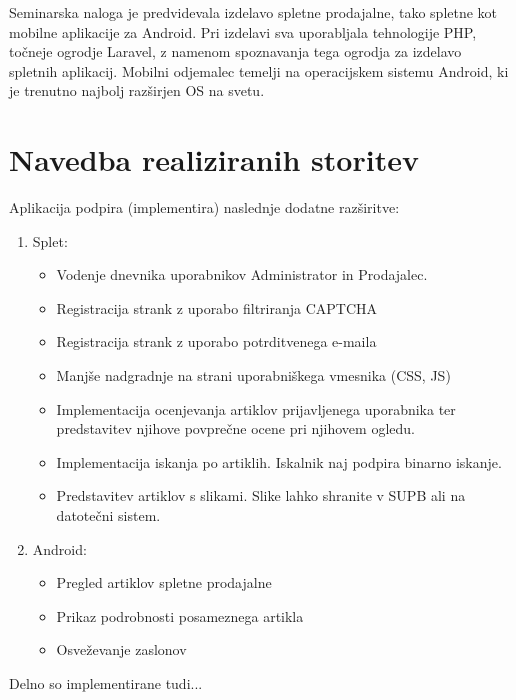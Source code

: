 \documentclass[a4paper,12pt]{report}
\begin{document}
Seminarska naloga je predvidevala izdelavo spletne prodajalne, tako spletne kot mobilne aplikacije za Android. Pri izdelavi sva uporabljala tehnologije PHP, točneje ogrodje Laravel, z namenom spoznavanja tega ogrodja za izdelavo spletnih aplikacij. Mobilni odjemalec temelji na operacijskem sistemu Android, ki je trenutno najbolj razširjen OS na svetu.


\chapter{Navedba realiziranih storitev}
Aplikacija podpira (implementira) naslednje dodatne razširitve:
\begin{enumerate}
    \item Splet:
    \begin{itemize}
        \item Vodenje dnevnika uporabnikov Administrator in Prodajalec.
        \item Registracija strank z uporabo filtriranja CAPTCHA
        \item Registracija strank z uporabo potrditvenega e-maila
        \item Manjše nadgradnje na strani uporabniškega vmesnika (CSS, JS)
        \item Implementacija ocenjevanja artiklov prijavljenega uporabnika ter predstavitev njihove povprečne ocene pri njihovem ogledu.
        \item Implementacija iskanja po artiklih. Iskalnik naj podpira binarno iskanje.
        \item Predstavitev artiklov s slikami. Slike lahko shranite v SUPB ali na datotečni sistem.
    \end{itemize}
    \item Android:
    \begin{itemize}
        \item Pregled artiklov spletne prodajalne
        \item Prikaz podrobnosti posameznega artikla
        \item Osveževanje zaslonov
    \end{itemize}
\end{enumerate}

Delno so implementirane tudi...
\end{document}
